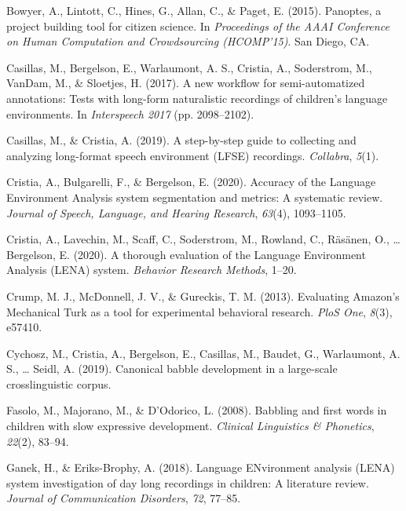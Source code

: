 \documentclass[english,,man]{apa6}
\begin{document}
\leavevmode\hypertarget{ref-bowyer2015panoptes}{}%
Bowyer, A., Lintott, C., Hines, G., Allan, C., \& Paget, E. (2015). Panoptes, a project building tool for citizen science. In \emph{Proceedings of the AAAI Conference on Human Computation and Crowdsourcing (HCOMP'15)}. San Diego, CA.

\leavevmode\hypertarget{ref-casillas2017new}{}%
Casillas, M., Bergelson, E., Warlaumont, A. S., Cristia, A., Soderstrom, M., VanDam, M., \& Sloetjes, H. (2017). A new workflow for semi-automatized annotations: Tests with long-form naturalistic recordings of children's language environments. In \emph{Interspeech 2017} (pp. 2098--2102).

\leavevmode\hypertarget{ref-casillas2019step}{}%
Casillas, M., \& Cristia, A. (2019). A step-by-step guide to collecting and analyzing long-format speech environment (LFSE) recordings. \emph{Collabra}, \emph{5}(1).

\leavevmode\hypertarget{ref-cristia2020accuracy}{}%
Cristia, A., Bulgarelli, F., \& Bergelson, E. (2020). Accuracy of the Language Environment Analysis system segmentation and metrics: A systematic review. \emph{Journal of Speech, Language, and Hearing Research}, \emph{63}(4), 1093--1105.

\leavevmode\hypertarget{ref-cristia2020thorough}{}%
Cristia, A., Lavechin, M., Scaff, C., Soderstrom, M., Rowland, C., Räsänen, O., \ldots{} Bergelson, E. (2020). A thorough evaluation of the Language Environment Analysis (LENA) system. \emph{Behavior Research Methods}, 1--20.

\leavevmode\hypertarget{ref-crump2013evaluating}{}%
Crump, M. J., McDonnell, J. V., \& Gureckis, T. M. (2013). Evaluating Amazon's Mechanical Turk as a tool for experimental behavioral research. \emph{PloS One}, \emph{8}(3), e57410.

\leavevmode\hypertarget{ref-cychosz2019canonical}{}%
Cychosz, M., Cristia, A., Bergelson, E., Casillas, M., Baudet, G., Warlaumont, A. S., \ldots{} Seidl, A. (2019). Canonical babble development in a large-scale crosslinguistic corpus.

\leavevmode\hypertarget{ref-fasolo2008babbling}{}%
Fasolo, M., Majorano, M., \& D'Odorico, L. (2008). Babbling and first words in children with slow expressive development. \emph{Clinical Linguistics \& Phonetics}, \emph{22}(2), 83--94.

\leavevmode\hypertarget{ref-ganek2018language}{}%
Ganek, H., \& Eriks-Brophy, A. (2018). Language ENvironment analysis (LENA) system investigation of day long recordings in children: A literature review. \emph{Journal of Communication Disorders}, \emph{72}, 77--85.
\end{document}

